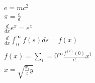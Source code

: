 \documentclass[a4paper,12pt]{article}
\begin{document}
\begin{eqnarray}
e=mc^2\\
\pi=\frac{c}{d}\\
\frac{d}{dx} e^x=e^x\\
\frac{d}{dx}\int_0^\infty f(s)ds=f(x)\\
f(x)=\sum_{i}=0^\infty \frac{f^{(i)} (0)}{i!}x^i\\
x=\sqrt{\frac{x_i}{z}y}
\end{eqnarray}
\end{document}
